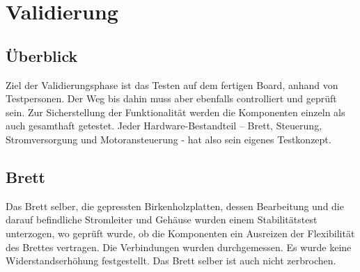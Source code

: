 \chapter{Validierung} \label{Validierung}

\section{Überblick} \label{ValidUeberblick}
Ziel der Validierungsphase ist das Testen auf dem fertigen Board, anhand von Testpersonen. Der Weg bis dahin muss aber ebenfalls controlliert und geprüft sein. Zur Sicherstellung der Funktionalität werden die Komponenten einzeln als auch gesamthaft getestet. 
Jeder Hardware-Bestandteil – Brett, Steuerung, Stromversorgung und Motoransteuerung - hat also sein eigenes Testkonzept.

\section{Brett} \label{ValidBrett}
Das Brett selber, die gepressten Birkenholzplatten, dessen Bearbeitung und die darauf befindliche Stromleiter und Gehäuse wurden einem Stabilitätstest unterzogen, wo geprüft wurde, ob die Komponenten ein Ausreizen der Flexibilität des Brettes vertragen. Die Verbindungen wurden durchgemessen. Es wurde keine Widerstandserhöhung festgestellt. Das Brett selber ist auch nicht zerbrochen.

